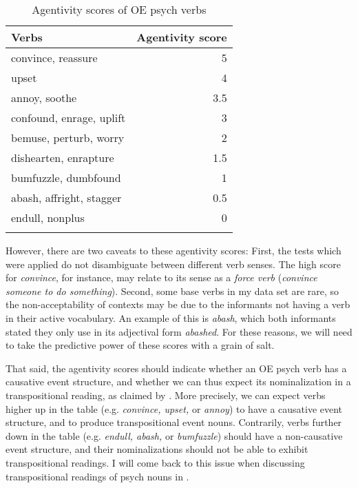 \begin{table}
		\caption{\label{tab:psych-agent}Agentivity scores of OE psych verbs} 
		\begin{tabular} {lr}
 			\lsptoprule
			Verbs & \multicolumn{1}{l}{Agentivity score} \\
			\midrule
			convince, reassure		  	& 5\phantom{.5} \\
			upset					  	& 4\phantom{.5} \\
			annoy, soothe				& 3.5 \\
			confound, enrage, uplift   	& 3\phantom{.5}             \\
			bemuse, perturb, worry		& 2\phantom{.5} \\
			dishearten, enrapture       & 1.5              \\
			bumfuzzle, dumbfound        & 1\phantom{.5}                \\
			abash, affright, stagger    & 0.5              \\
			endull, nonplus		        & 0\phantom{.5}              \\
			\lspbottomrule
		\end{tabular}
\end{table} 

However, there are two caveats to these agentivity scores: 
First, the tests which were applied do not disambiguate between different verb senses. The high score for \textit{convince}, for instance, may relate to its sense as a \textit{force verb} (\textit{convince someone to do something}). 
Second, some base verbs in my data set are rare, so the non-acceptability of contexts may be due to the informants not having a verb in their active vocabulary. An example of this is \textit{abash}, which both informants stated they only use in its adjectival form \textit{abashed}.
For these reasons, we will need to take the predictive power of these scores with a grain of salt.

That said, the agentivity scores should indicate whether an OE psych verb has a causative event structure, and whether we can thus expect its nominalization in a transpositional reading, as claimed by \citet{Grimshaw.1990}. More precisely, we can expect verbs higher up in the table (e.g. \textit{convince, upset,} or \textit{annoy}) to have a causative event structure, and to produce transpositional event nouns. Contrarily, verbs further down in the table (e.g. \textit{endull, abash,} or \textit{bumfuzzle}) should have a non-causative event structure, and their nominalizations should not be able to exhibit transpositional readings. I will come back to this issue when discussing transpositional readings of psych nouns in . 

